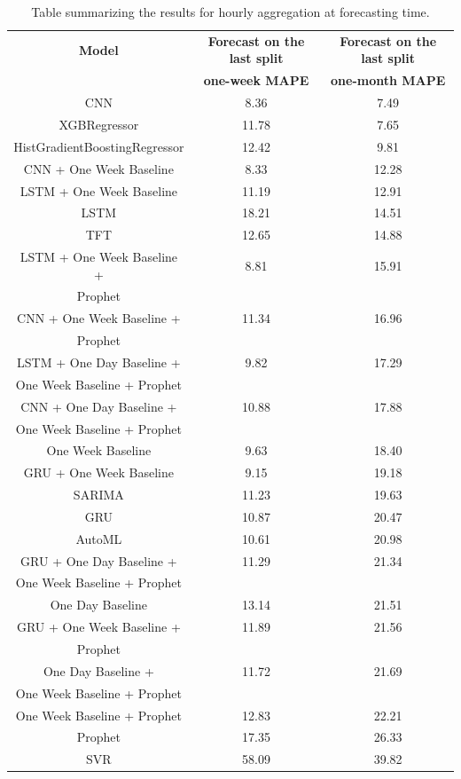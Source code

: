 \begin{table}[H]
\centering
\begin{tabular}{|c|c|c|}
\hline
\textbf{Model} & \textbf{Forecast on the last split} & \textbf{Forecast on the last split}\\
 & \textbf{one-week MAPE} & \textbf{one-month MAPE}\\
\hline
CNN & 8.36 & 7.49\\
\hline
XGBRegressor & 11.78 & 7.65\\
\hline
HistGradientBoostingRegressor & 12.42 & 9.81\\
\hline
CNN + One Week Baseline & 8.33 & 12.28\\
\hline
LSTM + One Week Baseline & 11.19 & 12.91\\
\hline
LSTM & 18.21 & 14.51\\
\hline
TFT & 12.65 & 14.88\\
\hline
LSTM + One Week Baseline + & 8.81 & 15.91\\
Prophet & & \\
\hline
CNN + One Week Baseline + & 11.34 & 16.96\\
Prophet & & \\
\hline
LSTM + One Day Baseline + & 9.82 & 17.29\\
One Week Baseline + Prophet & & \\
\hline
CNN + One Day Baseline + & 10.88 & 17.88\\
One Week Baseline + Prophet & & \\
\hline
One Week Baseline & 9.63 & 18.40\\
\hline
GRU + One Week Baseline & 9.15 & 19.18\\
\hline
SARIMA & 11.23 & 19.63\\
\hline
GRU & 10.87 & 20.47\\
\hline
AutoML & 10.61 & 20.98\\
\hline
GRU + One Day Baseline + & 11.29 & 21.34\\
One Week Baseline + Prophet & & \\
\hline
One Day Baseline & 13.14 & 21.51\\
\hline
GRU + One Week Baseline + & 11.89 & 21.56\\
Prophet & & \\
\hline
One Day Baseline + & 11.72 & 21.69\\
One Week Baseline + Prophet & & \\
\hline
One Week Baseline + Prophet & 12.83 & 22.21\\
\hline
Prophet & 17.35 & 26.33\\
\hline
SVR & 58.09 & 39.82\\
\hline
\end{tabular}
\caption{Table summarizing the results for hourly aggregation at forecasting time.}
\label{tab:demanddailyresultsforecast}
\end{table}

